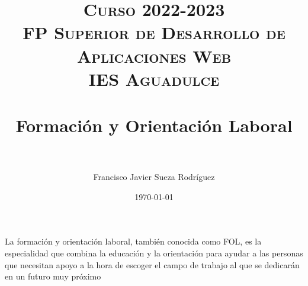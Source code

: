 


\title{	
\normalfont \normalsize 
\textsc{{\bfseries Curso 2022-2023} \\ FP Superior de Desarrollo de Aplicaciones Web \\ IES Aguadulce} \\ [25pt] 
\horrule{0.5pt} \\[0.4cm] 
\huge Formación y Orientación Laboral \\ 
\horrule{0.5pt} \\[0.4cm] 
}

\author{Francisco Javier Sueza Rodríguez} 
\date{\normalsize\today} 




\maketitle

\newpage 

\tableofcontents 



\newpage

La formación y orientación laboral, también conocida como FOL, es la especialidad que combina la educación y la orientación para ayudar a las personas que necesitan apoyo a la hora de escoger el campo de trabajo al que se dedicarán en un futuro muy próximo

 
 
 
  
 

